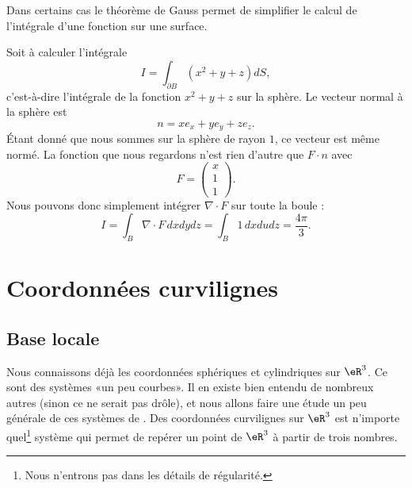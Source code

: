 Dans certains cas le théorème de Gauss permet de simplifier le calcul de l'intégrale d'une fonction sur une surface.

\begin{example}
	Soit à calculer l'intégrale
	\begin{equation}
		I=\int_{\partial B}(x^2+y+z)dS,
	\end{equation}
	c'est-à-dire l'intégrale de la fonction \( x^2+y+z\) sur la sphère. Le vecteur normal à la sphère est
	\begin{equation}
		n=xe_x+ye_y+ze_z.
	\end{equation}
	Étant donné que nous sommes sur la sphère de rayon \( 1\), ce vecteur est même normé. La fonction que nous regardons n'est rien d'autre que \( F\cdot n\) avec
	\begin{equation}
		F=\begin{pmatrix}
			x \\
			1 \\
			1
		\end{pmatrix}.
	\end{equation}
	Nous pouvons donc simplement intégrer \( \nabla\cdot F\) sur toute la boule :
	\begin{equation}
		I=\int_{B}\nabla\cdot F\,dxdydz=\int_B 1\,dxdudz=\frac{ 4\pi }{ 3 }.
	\end{equation}
\end{example}

\section{Coordonnées curvilignes}

\subsection{Base locale}

Nous connaissons déjà les coordonnées sphériques et cylindriques sur \( \eR^3\). Ce sont des systèmes «un peu courbes». Il en existe bien entendu de nombreux autres (sinon ce ne serait pas drôle), et nous allons faire une étude un peu générale de ces systèmes de . Des coordonnées curvilignes sur \( \eR^3\) est n'importe quel\footnote{Nous n'entrons pas dans les détails de régularité.} système qui permet de repérer un point de \( \eR^3\) à partir de trois nombres.

